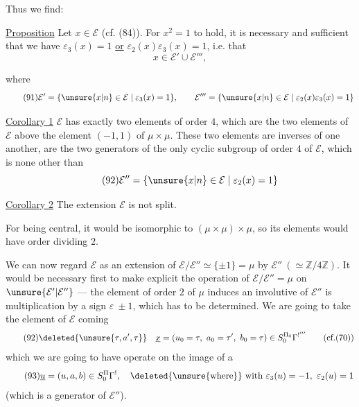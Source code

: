 Thus we find:

\uline{Proposition} Let $x\in\mathcal E$ (cf. (84)). For
$x^2=1$ to hold, it is necessary and sufficient that we have
$\varepsilon_3(x)=1$ \uline{or} $\varepsilon_2(x)\varepsilon_3(x)=1$,
i.e. that
\[
\tag{90}
x\in\mathcal E'\cup\mathcal E''',
\]



where
\[
\tag{91}
\mathcal E'=\{\unsure{x|n}\in\mathcal E\mid\varepsilon_3(x)=1\},\qquad
\mathcal E'''=\{\unsure{x|n}\in\mathcal E\mid\varepsilon_2(x)\varepsilon_3(x)=1\}
\]

\uline{Corollary 1} $\mathcal E$ has exactly two elements
of order $4$, which are the two elements of $\mathcal E$
above the element $(-1,1)$ of $\mu\times\mu$.
These two elements are inverses of one
another,  are the two generators of
the only cyclic subgroup of order $4$ of $\mathcal E$,
which is none other than
\[
\tag{92}
\mathcal E''=\{\unsure{x|n}\in\mathcal E\mid\varepsilon_2(x)=1\}
\]

\uline{Corollary 2} The extension $\mathcal E$ is not split.

For being central, it  would be isomorphic
to $(\mu\times\mu)\times\mu$, so its elements would have order
dividing $2$.

We can now regard
$\mathcal E$ as an extension of $\mathcal E/\mathcal E''\simeq\{\pm1\}=\mu$ by
$\mathcal E''\ (\simeq\mathbb Z/4\mathbb Z)$.
 It would be necessary
first to make explicit the operation of $\mathcal E/\mathcal E''=\mu$
on $\unsure{\mathcal E'|\mathcal E''}$ --- the element  of order $2$ of $\mu$
induces an involutive  of  $\mathcal E''$
 is multiplication by a
sign $\varepsilon\ \pm1$, which has to be determined. We are going
to take 
the element of $\mathcal E$ coming
\[
\tag{92}
\deleted{\unsure{\tau,a',\tau}}\quad
\underline x=(u_0=\tau,\ a_0=\tau',\ b_0=\tau)
\in S_0^{\Pi_0}\Gamma^{!'''}\qquad(\text{cf.}(70))
\]
which we are going to have operate on the image of a
\[
\tag{93}
\underline u=(u,a,b)\in S_0^{\Pi}\Gamma^{!},\quad
\deleted{\unsure{\text{where}}}\ \text{with }\varepsilon_3(u)=-1,\ \varepsilon_2(u)=1
\]
(which is a generator of $\mathcal E''$).

